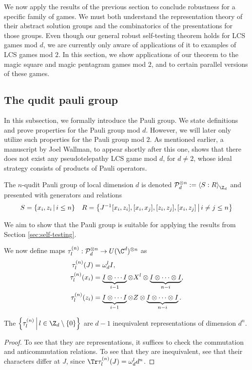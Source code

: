 We now apply the results of the previous section to conclude robustness for a specific family of games.
We must both understand the representation theory of their abstract solution groups and the combinatorics of the presentations for those groups. Even though our general robust self-testing theorem holds for LCS games mod $d$, we are currently only aware of applications of it to examples of LCS games mod $2$. In this section, we show applications of our theorem to the magic square and magic pentagram games mod $2$, and to certain parallel versions of these games.

\subsection{The qudit pauli group}
In this subsection, we formally introduce the Pauli group. We state definitions and prove properties for the Pauli group mod $d$. However, we will later only utilize such properties for the Pauli group mod $2$. As mentioned earlier, a manuscript by Joel Wallman, to appear shortly after this one, shows that there does not exist any pseudotelepathy LCS game mod $d$, for $d\neq 2$, whose ideal strategy consists of products of Pauli operators.
\begin{definition}\label{definition:n-qudit-pauli-group}
	The $n$-qudit Pauli group of local dimension $d$ is denoted $\m P_d^{\otimes n} := \braket{S:R}_{\Z_d}$ and presented with generators and relations
	\begin{align}
		S = \left\{x_i,z_i\,\middle\vert\,i\leq n\right\}
		&&
		R = \left\{J^{-1}[x_i,z_i], [x_i,x_j], [z_i,z_j], [x_i,z_j]\,\middle\vert\,i \neq j \leq n\right\}
	\end{align}
\end{definition}

We aim to show that the Pauli group is suitable for applying the results from Section \ref{sec:self-testing}. 

\begin{definition}
\label{def:representations-pauli-group}
	We now define maps $\tau_l^{(n)}: \m P_d^{\otimes n} \to U(\C^{d})^{\otimes n}$ as 
	\begin{align}
	\tau_l^{(n)}(J) &= \omega_d^l I
	,
	\\\tau_l^{(n)}(x_i) &= \underbrace{I\otimes \cdots I}_{i-1} \otimes X^l \otimes \underbrace{I \otimes\cdots \otimes I}_{n-i}
	,
	\\\tau_l^{(n)}(z_i) &= \underbrace{I\otimes \cdots I}_{i-1} \otimes Z \otimes \underbrace{I \otimes\cdots \otimes I}_{n-i}.
	\end{align}
\end{definition}
\begin{lemma}
\label{lemma:representations-pauli-group}
	The $\set{\tau_l^{(n)}\;l\in \Z_d\minus\set0}$ are $d-1$ inequivalent representations of dimension $d^n$. 
\end{lemma}
\begin{proof}
	To see that they are representations, it suffices to check the commutation and anticommutation relations. To see that they are inequivalent, see that their characters differ at $J$, since $\Tr\tau_l^{(n)}(J) = \w_d^ld^n$. 
\end{proof}


